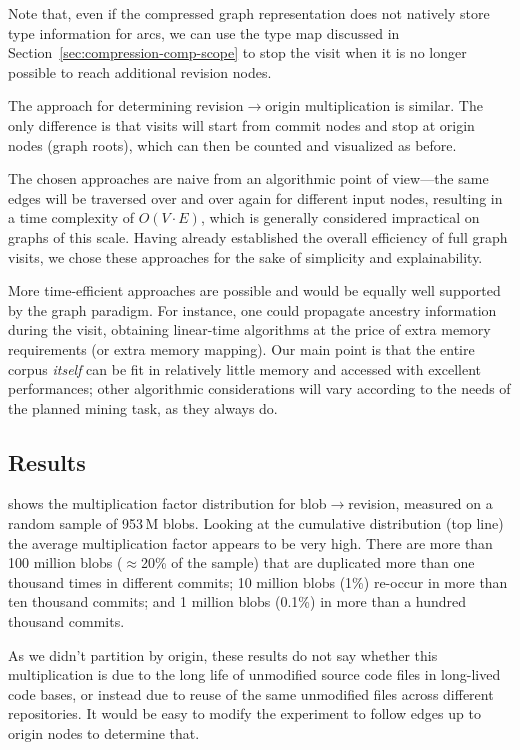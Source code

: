 Note that, even if the compressed graph representation does not natively store
type information for arcs, we can use the type map discussed in
Section~\ref{sec:compression-comp-scope} to stop the visit when it is no longer
possible to reach additional revision nodes.

The approach for determining revision$\to$origin multiplication is similar.
The only difference is that visits will start from commit nodes and stop at
origin nodes (graph roots), which can then be counted and visualized as before.

The chosen approaches are naive from an algorithmic point of view---the same
edges will be traversed over and over again for different input nodes,
resulting in a time complexity of $O(V\cdot E)$, which is generally considered
impractical on graphs of this scale.  Having already established the overall
efficiency of full graph visits, we chose these approaches for the sake of
simplicity and explainability.

More time-efficient approaches are possible and would be equally well supported
by the graph paradigm. For instance, one could propagate ancestry information
during the visit, obtaining linear-time algorithms at the price of extra memory
requirements (or extra memory mapping). Our main point is that the entire
corpus \emph{itself} can be fit in relatively little memory and accessed with
excellent performances; other algorithmic considerations will vary according to
the needs of the planned mining task, as they always do.


\subsection{Results}

 shows the multiplication factor
distribution for blob$\to$revision, measured on a random sample of 953\,M
blobs. Looking at the cumulative distribution (top line) the average
multiplication factor appears to be very high. There are more than 100 million
blobs ($\approx$20\% of the sample) that are duplicated more than one
thousand times in different commits; 10 million blobs (1\%) re-occur in more
than ten thousand commits; and 1 million blobs (0.1\%) in more than a
hundred thousand commits.

As we didn't partition by origin, these results do not say whether this
multiplication is due to the long life of unmodified source code files in
long-lived code bases, or instead due to reuse of the same unmodified files
across different repositories. It would be easy to modify the experiment to
follow edges up to origin nodes to determine that.

